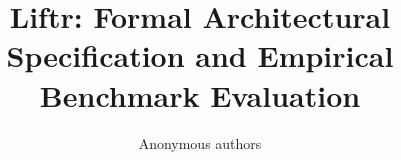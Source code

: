 \title{\textbf{Liftr: Formal Architectural Specification and Empirical Benchmark Evaluation}}

\author{Anonymous authors}
